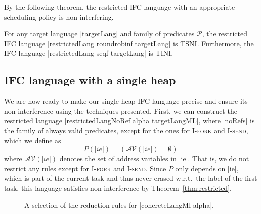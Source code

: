 By the following theorem, the restricted IFC language with an
appropriate scheduling policy is non-interfering.

\begin{theorem}
  \label{thm:restricted}
  For any target language |targetLang| and family of predicates
  $\mathcal{P}$, the restricted IFC language |restrictedLang roundrobinf targetLang|
  is TSNI.  Furthermore, the IFC language
  |restrictedLang seqf targetLang| is TINI.
\end{theorem}


\subsection{IFC language with a single heap}

We are now ready to make our single heap IFC language precise and
ensure its non-interference using the techniques presented.
First, we can construct the restricted language
|restrictedLangNoRef alpha targetLangML|, where |noRefs| is
the family of always valid predicates, except for the ones for
\textsc{I-fork} and \textsc{I-send}, which we define as
\[ P(|ie|) = (\mathcal{AV}(|ie|) = \emptyset{}) \]
where $\mathcal{AV}(|ie|)$ denotes the set of address variables in |ie|.
That is, we do not restrict any rules except for \textsc{I-fork}
and \textsc{I-send}.
Since $P$ only depends on |ie|, which is part of the current
task and thus never erased w.r.t.\ the label of the first task,
this language satisfies non-interference by Theorem~\ref{thm:restricted}.

\begin{figure}
  
  
  \caption{A selection of the reduction rules for |concreteLangMl alpha|.}
  \label{fig:concrete}
\end{figure}

